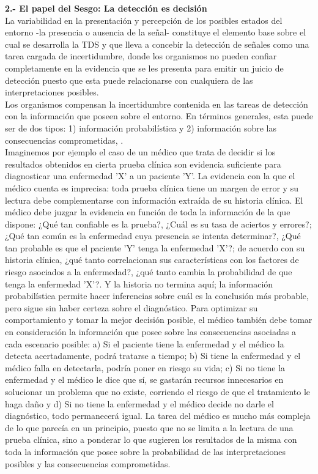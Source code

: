   \textbf{2.- El papel del Sesgo: La detección es decisión}\\

La variabilidad en la presentación y percepción de los posibles estados del entorno -la presencia o ausencia de la señal- constituye el elemento base sobre el cual se desarrolla la TDS y que lleva a concebir la detección de señales como una tarea cargada de incertidumbre, donde los organismos no pueden confiar completamente en la evidencia que se les presenta para emitir un juicio de detección puesto que esta puede relacionarse con cualquiera de las interpretaciones posibles.\\

Los organismos compensan la incertidumbre contenida en las tareas de detección con la información que poseen sobre el entorno. En términos generales, esta puede ser de dos tipos: 1) información probabilística y 2) información sobre las consecuencias comprometidas, \parencite{Nevin1969}.\\

Imaginemos por ejemplo el caso de un médico que trata de decidir si los resultados obtenidos en cierta prueba clínica son evidencia suficiente para diagnosticar una enfermedad 'X' a un paciente 'Y'. La evidencia con la que el médico cuenta es imprecisa: toda prueba clínica tiene un margen de error y su lectura debe complementarse con información extraída de su historia clínica. El médico debe juzgar la evidencia en función de toda la información de la que dispone: ¿Qué tan confiable es la prueba?, ¿Cuál es su tasa de aciertos y errores?; ¿Qué tan común es la enfermedad cuya presencia se intenta determinar?, ¿Qué tan probable es que el paciente 'Y' tenga la enfermedad 'X'?; de acuerdo con su historia clínica, ¿qué tanto correlacionan sus características con los factores de riesgo asociados a la enfermedad?, ¿qué tanto cambia la probabilidad de que tenga la enfermedad 'X'?. Y la historia no termina aquí; la información probabilística permite hacer inferencias sobre cuál es la conclusión más probable, pero sigue sin haber certeza sobre el diagnóstico. Para optimizar su comportamiento y tomar la mejor decisión posible, el médico también debe tomar en consideración la información que posee sobre las consecuencias asociadas a cada escenario posible: a) Si el paciente tiene la enfermedad y el médico la detecta acertadamente, podrá tratarse a tiempo; b) Si tiene la enfermedad y el médico falla en detectarla, podría poner en riesgo su vida; c) Si no tiene la enfermedad y el médico le dice que sí, se gastarán recursos innecesarios en solucionar un problema que no existe, corriendo el riesgo de que el tratamiento le haga daño y d) Si no tiene la enfermedad y el médico decide no darle el diagnóstico, todo permanecerá igual. La tarea del médico es mucho más compleja de lo que parecía en un principio, puesto que no se limita a la lectura de una prueba clínica, sino a ponderar lo que sugieren los resultados de la misma con toda la información que posee sobre la probabilidad de las interpretaciones posibles y las consecuencias comprometidas.\\

